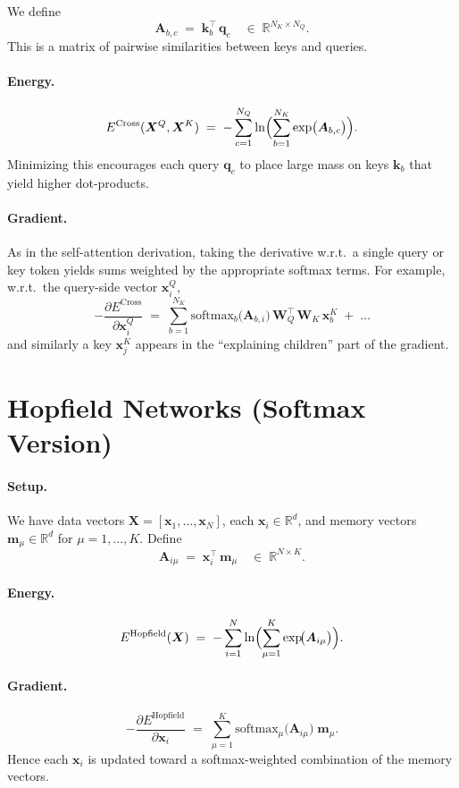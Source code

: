 \documentclass{article}
\begin{document}
We define
\[
\bm{A}_{b,c}
\;=\;
\bm{k}_b^\top \,\bm{q}_c
\quad\in\;\mathbb{R}^{N_K \times N_Q}.
\]
This is a matrix of pairwise similarities between keys and queries.

\paragraph{Energy.}
\[
E^{\mathrm{Cross}}(\bm{X}^Q,\bm{X}^K)
\;=\;
-\sum_{c=1}^{N_Q}
\ln \Bigl(
\sum_{b=1}^{N_K}
\exp\bigl(\bm{A}_{b,c}\bigr)
\Bigr).
\]
Minimizing this encourages each query \(\bm{q}_c\) to place large mass on keys \(\bm{k}_b\) that yield higher dot-products.

\paragraph{Gradient.}
As in the self-attention derivation, taking the derivative w.r.t.\ a single query or key token yields sums weighted by the appropriate softmax terms.  For example, w.r.t.\ the query-side vector \(\bm{x}^Q_i\),
\[
-\frac{\partial E^{\mathrm{Cross}}}{\partial \bm{x}^Q_i}
\;=\;
\sum_{b=1}^{N_K}
\text{softmax}_b\!\bigl(\bm{A}_{b,i}\bigr)\,
\bm{W}_Q^\top\,\bm{W}_K\,\bm{x}^K_b
\;+\;\dots 
\]
and similarly a key \(\bm{x}^K_j\) appears in the “explaining children” part of the gradient.

\section{Hopfield Networks (Softmax Version)}
\paragraph{Setup.}
We have data vectors \(\bm{X} = [\bm{x}_1,\ldots,\bm{x}_N]\), each \(\bm{x}_i \in \mathbb{R}^d\), and memory vectors \(\bm{m}_\mu \in \mathbb{R}^d\) for \(\mu=1,\ldots,K\).  Define 
\[
\bm{A}_{i\mu}
\;=\;
\bm{x}_i^\top \,\bm{m}_\mu
\quad\in\;\mathbb{R}^{N\times K}.
\]

\paragraph{Energy.}
\[
E^{\mathrm{Hopfield}}(\bm{X})
\;=\;
-\sum_{i=1}^N
\ln \Bigl(\sum_{\mu=1}^K
\exp\!\bigl(\bm{A}_{i\mu}\bigr)\Bigr).
\]

\paragraph{Gradient.}
\[
-\frac{\partial E^{\mathrm{Hopfield}}}{\partial \bm{x}_i}
\;=\;
\sum_{\mu=1}^K
\text{softmax}_\mu\!\bigl(\bm{A}_{i\mu}\bigr)
\;\bm{m}_\mu.
\]
Hence each \(\bm{x}_i\) is updated toward a softmax-weighted combination of the memory vectors.
\end{document}
